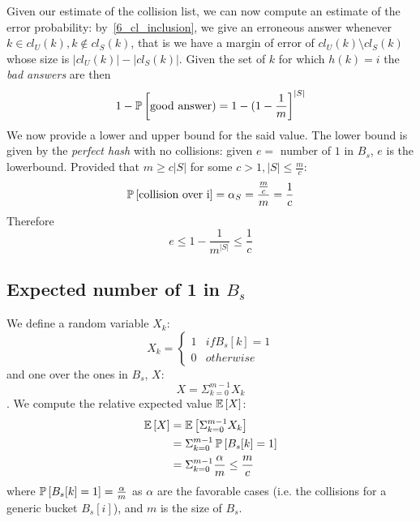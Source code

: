 Given our estimate of the collision list, we can now compute an estimate of the
error probability: by~\ref{6_cl_inclusion}, we give an erroneous answer whenever
$k \in cl_{U}(k), k \notin cl_{S}(k)$, that is we have a margin of error of
$cl_{U}(k) \setminus cl_{S}(k)$ whose size is $|cl_{U}(k)| - |cl_{S}(k)|$.
Given the set of $k$ for which $h(k) = i$ the \emph{bad answers} are then
    \begin{equation}
    1 - \operatorname*{\mathbb{P}}\left[{\textrm{good answer}) = 1 - {(1 - \frac{1}{m}}}\right]^{|S|}
    \end{equation}
We now provide a lower and upper bound for the said value.
The lower bound is given by the \emph{perfect hash} with no collisions: given
$e = $ number of $1$ in $B_s$, $e$ is the lowerbound.
Provided that  $m \geq c |S|$ for some $c > 1, |S| \leq \frac{m}{c}$:
    \begin{equation}
    \operatorname*{\mathbb{P}}\left[{\textrm{collision over i}}\right] = \alpha_{S} = \frac{\frac{m}{c}}{m} = \frac{1}{c}
    \end{equation}
Therefore
    \begin{equation}
    e \leq 1 - \frac{1}{m^{|S|}} \leq \frac{1}{c}
    \end{equation}

\subsection{Expected number of 1 in $B_{s}$}
We define a random variable $X_{k}$:
    \begin{equation*}
    X_{k} = \begin{cases}
            1   & if B_{s}[k] = 1  \\
            0   & otherwise
            \end{cases}
    \end{equation*}
and one over the ones in $B_{s}$, $X$:
    \begin{equation}
        X = \Sigma_{k = 0}^{m - 1}X_k
    \end{equation}.
We compute the relative expected value $\mathbb{E}\left[{X}\right]$:
    \begin{align*}
       \mathbb{E}\left[{X}\right] & = \mathbb{E}\left[{\Sigma_{k = 0}^{m - 1}X_k}\right] \\
       & = \Sigma_{k = 0}^{m - 1}\operatorname*{\mathbb{P}}\left[{B_{s}[k] = 1}\right] \\
       & = \Sigma_{k = 0}^{m - 1}\frac{\alpha}{m} \leq \frac{m}{c}
   \end{align*}
where $\operatorname*{\mathbb{P}}\left[{B_{s}[k] = 1}\right] = \frac{\alpha}{m}$ as $\alpha$ are the favorable cases
(i.e. the collisions for a generic bucket $B_s[i]$), and $m$ is the size of $B_s$.
